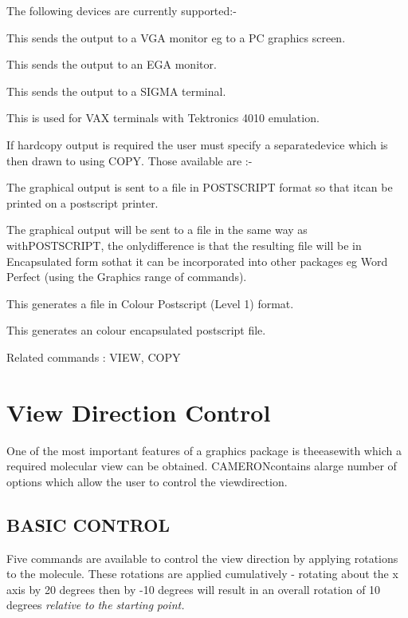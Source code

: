 \documentclass[10pt,a4paper]{report}
\begin{document}
\bigskip{}

The following devices are currently supported:-

\bigskip{}This sends the output to a VGA monitor eg to a PC graphics screen.

\bigskip{}This sends the output to an EGA monitor.

\bigskip{}This sends the output to a SIGMA terminal.

\bigskip{}This is used for VAX terminals with Tektronics 4010 emulation.



\bigskip{}



If hardcopy output is required the user must specify a separatedevice which is then drawn to using COPY. Those available are :-

\bigskip{}The graphical output is sent to a file in POSTSCRIPT format so that itcan be printed on a postscript printer.

\bigskip{}The graphical output will be sent to a file in the same way as withPOSTSCRIPT, the onlydifference is that the resulting file will be in Encapsulated form sothat it can be incorporated into other packages eg Word Perfect (using the Graphics range of commands).

\bigskip{}This generates a file in Colour Postscript (Level 1) format.



\bigskip{}This generates an colour encapsulated postscript file.

Related commands : VIEW, COPY\chapter{View Direction Control}

One of the most important features of a graphics package is theeasewith which a required molecular view can be obtained. CAMERONcontains alarge number of options which allow the user to control the viewdirection.\section{BASIC CONTROL}


Five commands are available to control the view direction by
applying
rotations to the molecule. These rotations are applied
cumulatively -
rotating about the x axis by 20 degrees then by -10 degrees will
result
in an overall rotation of 10 degrees \emph{relative} \emph{to} \emph{the} \emph{starting} \emph{point.}
\end{document}
